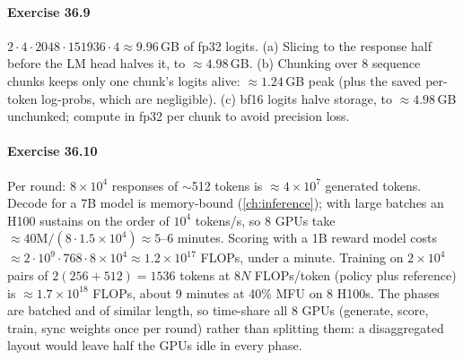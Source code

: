 \paragraph{Exercise 36.9} $2\cdot4\cdot2048\cdot151936\cdot4\approx9.96$\,GB of fp32 logits.
(a) Slicing to the response half before the LM head halves it, to $\approx4.98$\,GB. (b) Chunking over 8
sequence chunks keeps only one chunk's logits alive: $\approx1.24$\,GB peak (plus the saved
per-token log-probs, which are negligible). (c) bf16 logits halve storage, to $\approx4.98$\,GB unchunked;
compute  in fp32 per chunk to avoid precision loss.

\paragraph{Exercise 36.10} Per round: $8\times10^4$ responses of $\sim$512 tokens is
$\approx4\times10^7$ generated tokens. Decode for a 7B model is memory-bound
(\cref{ch:inference}); with large batches an H100 sustains on the order of $10^4$ tokens/s, so 8
GPUs take $\approx40\text{M}/(8\cdot1.5\times10^4)\approx5$--6 minutes. Scoring with a 1B reward
model costs $\approx2\cdot10^9\cdot768\cdot8\times10^4\approx1.2\times10^{17}$ FLOPs, under a minute.
Training on $2\times10^4$ pairs of $2(256+512)=1536$ tokens at $8N$ FLOPs/token (policy plus
reference) is $\approx1.7\times10^{18}$ FLOPs, about 9 minutes at 40\% MFU on 8 H100s. The phases
are batched and of similar length, so time-share all 8 GPUs (generate, score, train, sync weights
once per round) rather than splitting them: a disaggregated layout would leave half the GPUs idle
in every phase.
